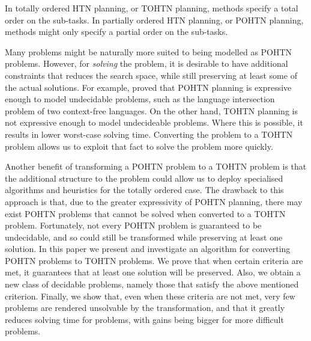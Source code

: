 \documentclass[letterpaper]{article} %
\begin{document}
In totally ordered HTN planning, or TOHTN planning, methods specify a total order on the sub-tasks. In partially ordered HTN planning, or POHTN planning, methods might only specify a partial order on the sub-tasks. 


Many problems might be naturally more suited to being modelled as POHTN problems. However, for \emph{solving} the problem, it is desirable to have additional constraints that reduces the search space, while still preserving at least some of the actual solutions. For example, \cite{ErolHTNExpressivity} proved that POHTN planning is expressive enough to model undecidable problems, such as the language intersection problem of two context-free languages. On the other hand, TOHTN planning is not expressive enough to model undecideable problems. Where this is possible, it results in lower worst-case solving time. Converting the problem to a TOHTN problem allows us to exploit that fact to solve the problem more quickly.

Another benefit of transforming a POHTN problem to a TOHTN problem is that the additional structure to the problem could allow us to deploy specialised algorithms and heuristics for the totally ordered case. %
The drawback to this approach is that, due to the greater expressivity of POHTN planning, there may exist POHTN problems that cannot be solved when converted to a TOHTN problem. 
Fortunately, not every POHTN problem is guaranteed to be undecidable, and so could still be transformed while preserving at least one solution.
In this paper we present and investigate an algorithm for converting POHTN problems to TOHTN problems. We prove that when certain criteria are met, it guarantees that at least one solution will be preserved. 
Also, we obtain a new class of decidable problems, namely those that satisfy the above mentioned criterion. Finally, we show that, even when these criteria are not met, very few problems are rendered unsolvable by the transformation, and that it greatly reduces solving time for problems, with gains being bigger for more difficult problems. 
\end{document}
